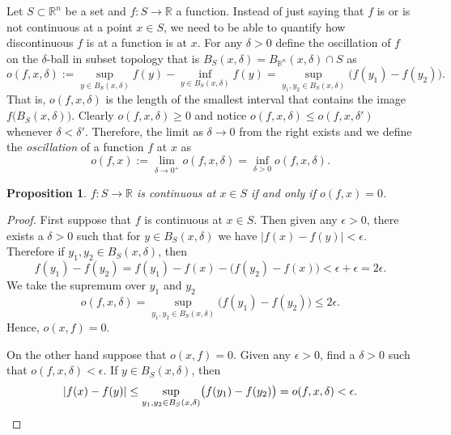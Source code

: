 \documentclass[12pt]{book}
\newcommand{\abs}[1]{\left\lvert {#1} \right\rvert}
\newcommand{\R}{{\mathbb{R}}}
\newcommand{\myindex}[1]{#1\index{#1}}
\theoremstyle{plain}
\newtheorem{prop}[thm]{Proposition}
\theoremstyle{remark}
\theoremstyle{definition}
\theoremstyle{exercise}
\theoremstyle{example}
\begin{document}
Let $S \subset \R^n$ be a set and $f \colon S \to \R$ a function.
Instead of just saying that $f$ is or is not continuous at
a point $x \in S$,
we need to be able to quantify how discontinuous $f$ is at a function is
at $x$.  For any $\delta > 0$ define the oscillation of 
$f$ on the $\delta$-ball in subset topology that is
$B_S(x,\delta) = B_{\R^n}(x,\delta) \cap S$ as
\begin{equation*}
o(f,x,\delta) :=
{\sup_{y \in B_S(x,\delta)} f(y)}
-
{\inf_{y \in B_S(x,\delta)} f(y)}
= 
\sup_{y_1,y_2 \in B_S(x,\delta)} \bigl(f(y_1)-f(y_2)\bigr) .
\end{equation*}
That is, $o(f,x,\delta)$ is the length of the smallest interval
that contains the image $f\bigl(B_S(x,\delta)\bigr)$.
Clearly $o(f,x,\delta) \geq 0$ and
notice $o(f,x,\delta) \leq o(f,x,\delta')$ whenever $\delta < \delta'$.
Therefore, the limit as $\delta \to 0$ from the right exists and
we define the \emph{\myindex{oscillation}} of a function $f$
at $x$ as
\begin{equation*}
o(f,x) :=
\lim_{\delta \to 0^+}
o(f,x,\delta) =
\inf_{\delta > 0}
o(f,x,\delta) .
\end{equation*}

\begin{prop}
$f \colon S \to \R$ is continuous at $x \in S$ if and only if $o(f,x) = 0$.
\end{prop}

\begin{proof}
First suppose that $f$ is continuous at $x \in S$.  Then given any $\epsilon > 0$,
there exists a $\delta > 0$ such that for $y \in B_S(x,\delta)$
we have $\abs{f(x)-f(y)} < \epsilon$.  Therefore if $y_1,y_2 \in
B_S(x,\delta)$, then
\begin{equation*}
f(y_1)-f(y_2) =
f(y_1)-f(x)-\bigl(f(y_2)-f(x)\bigr) < \epsilon + \epsilon = 2 \epsilon .
\end{equation*}
We take the supremum over $y_1$ and $y_2$
\begin{equation*}
o(f,x,\delta) = 
\sup_{y_1,y_2 \in B_S(x,\delta)} \bigl(f(y_1)-f(y_2)\bigr)
\leq
2 \epsilon .
\end{equation*}
Hence, $o(x,f) = 0$.

On the other hand suppose that $o(x,f) = 0$.  Given any $\epsilon > 0$,
find a $\delta > 0$ such that $o(f,x,\delta) < \epsilon$.  If
$y \in B_S(x,\delta)$, then
\begin{equation*}
\abs{f(x)-f(y)}
\leq
\sup_{y_1,y_2 \in B_S(x,\delta)} \bigl(f(y_1)-f(y_2)\bigr)
=
o(f,x,\delta) < \epsilon. \qedhere
\end{equation*}
\end{proof}
\end{document}
